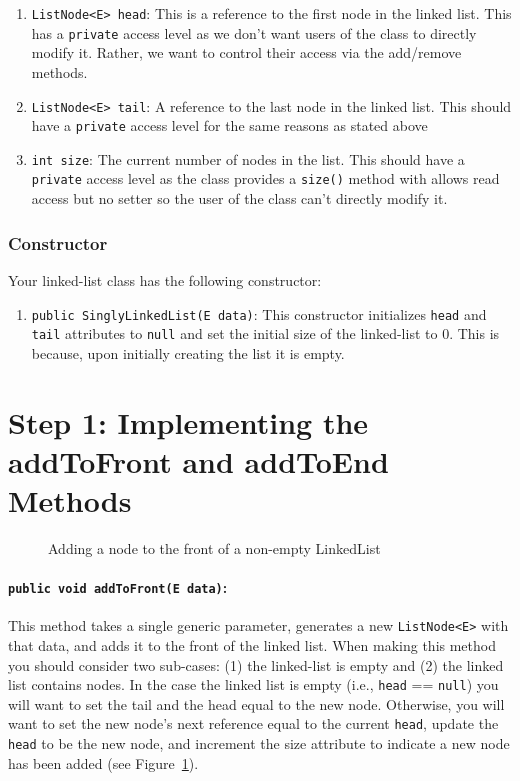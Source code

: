 \begin{enumerate}
    \item \lstinline|ListNode<E> head|: This is a reference to the first node in the linked list. This has a \lstinline|private| access level as we don't want users of the class to directly modify it. Rather, we want to control their access via the add/remove methods.
    \item \lstinline|ListNode<E> tail|: A reference to the last node in the linked list. This should have a \lstinline|private| access level for the same reasons as stated above
    \item \lstinline|int size|: The current number of nodes in the list. This should have a \lstinline|private| access level as the class provides a \lstinline|size()| method with allows read access but no setter so the user of the class can't directly modify it.
\end{enumerate}

\subsubsection{Constructor}

Your linked-list class has the following constructor:
\begin{enumerate}
    \item \lstinline|public SinglyLinkedList(E data)|: This constructor initializes \lstinline|head| and \lstinline|tail| attributes to \lstinline|null| and set the initial size of the linked-list to 0. This is because, upon initially creating the list it is empty.
\end{enumerate}


\newpage
\section{Step 1: Implementing the addToFront and addToEnd Methods}


\begin{figure}[H]
    
    \caption{Adding a node to the front of a non-empty LinkedList}
    \label{fig:addtofront}
\end{figure}

\paragraph{\lstinline|public void addToFront(E data)|: } This method takes a
single generic parameter, generates a new \lstinline|ListNode<E>| with that
data, and adds it to the front of the linked list. When making this method you
should consider two sub-cases: (1) the linked-list is empty and (2) the linked
list contains nodes. In the case the linked list is empty (i.e.,
\lstinline|head| == \lstinline|null|) you will want to set the tail and the head
equal to the new node. Otherwise, you will want to set the new node's next reference 
equal to the current \lstinline|head|, update the \lstinline|head| to be the new node,
and increment the size attribute to indicate a new node has been added (see
Figure~\ref{fig:addtofront}).\\

